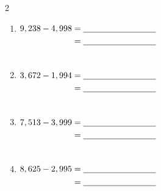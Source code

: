 \documentclass{article}
\begin{document}
\begin{multicols}{2}
\begin{enumerate}[label=\textbf{\arabic*.}, itemsep=1.8em, leftmargin=2em]
  \item $\begin{aligned}[t] 9,238 - 4,998 &= \underline{\hspace{3cm}} \\ &= \underline{\hspace{3cm}} \\ &\vphantom{4,315 + 3 = 4,318}\end{aligned}$
  \item $\begin{aligned}[t] 3,672 - 1,994 &= \underline{\hspace{3cm}} \\ &= \underline{\hspace{3cm}} \\ &\vphantom{4,315 + 3 = 4,318}\end{aligned}$
  \item $\begin{aligned}[t] 7,513 - 3,999 &= \underline{\hspace{3cm}} \\ &= \underline{\hspace{3cm}} \\ &\vphantom{4,315 + 3 = 4,318}\end{aligned}$
  \item $\begin{aligned}[t] 8,625 - 2,995 &= \underline{\hspace{3cm}} \\ &= \underline{\hspace{3cm}} \\ &\vphantom{4,315 + 3 = 4,318}\end{aligned}$
\end{enumerate}
\end{multicols}
\end{document}
